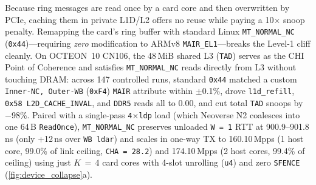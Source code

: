 Because ring messages are read once by a card core and then overwritten by PCIe, caching them in private L1D/L2 offers no reuse while paying a 10$\times$ snoop penalty. Remapping the card's ring buffer with standard Linux \texttt{MT\_NORMAL\_NC} (\texttt{0x44})---requiring \emph{zero} modification to ARMv8 \texttt{MAIR\_EL1}---breaks the Level-1 cliff cleanly. On OCTEON~10 CN106, the 48\,MiB shared L3 (\texttt{TAD}) serves as the CHI Point of Coherence and satisfies \texttt{MT\_NORMAL\_NC} reads directly from L3 without touching DRAM: across 147 controlled runs, standard \texttt{0x44} matched a custom \texttt{Inner-NC, Outer-WB} (\texttt{0xF4}) \texttt{MAIR} attribute within $\pm$0.1\%, drove \texttt{l1d\_refill}, \texttt{0x58 L2D\_CACHE\_INVAL}, and \texttt{DDR5} reads all to 0.00, and cut total \texttt{TAD} snoops by $-$98\%. Paired with a single-pass \texttt{4$\times$ldp} load (which Neoverse N2 coalesces into one 64\,B \texttt{ReadOnce}), \texttt{MT\_NORMAL\_NC} preserves unloaded \texttt{W\,=\,1} RTT at 900.9--901.8\,ns (only +12\,ns over \texttt{WB ldar}) and scales in one-way TX to 160.10\,Mpps (1 host core, 99.0\% of link ceiling, \texttt{CHA\,=\,28.2}) and 174.10\,Mpps (2 host cores, 99.4\% of ceiling) using just $K\,=\,4$ card cores with 4-slot unrolling (\texttt{u4}) and zero \texttt{SFENCE} (\autoref{fig:device_collapse}a).

